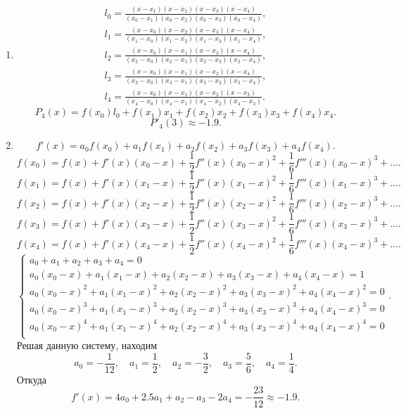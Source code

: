 \documentclass[a4paper]{article}
\begin{document}
\begin{sol}
\begin{enumerate}
\item 
\begin{gather*}
l_0=\frac{\left(x-x_1\right) \left(x-x_2\right) \left(x-x_3\right) \left(x-x_4\right)}{\left(x_0-x_1\right) \left(x_0-x_2\right) \left(x_0-x_3\right)
   \left(x_0-x_4\right)},\\l_1=
   \frac{\left(x-x_0\right) \left(x-x_2\right) \left(x-x_3\right) \left(x-x_4\right)}{\left(x_1-x_0\right) \left(x_1-x_2\right)
   \left(x_1-x_3\right) \left(x_1-x_4\right)},\\l_2=
   \frac{\left(x-x_0\right) \left(x-x_1\right) \left(x-x_3\right) \left(x-x_4\right)}{\left(x_2-x_0\right)
   \left(x_2-x_1\right) \left(x_2-x_3\right) \left(x_2-x_4\right)},\\l_3=
   \frac{\left(x-x_0\right) \left(x-x_1\right) \left(x-x_2\right)
   \left(x-x_4\right)}{\left(x_3-x_0\right) \left(x_3-x_1\right) \left(x_3-x_2\right) \left(x_3-x_4\right)},\\l_4=
   \frac{\left(x-x_0\right) \left(x-x_1\right)
   \left(x-x_2\right) \left(x-x_3\right)}{\left(x_4-x_0\right) \left(x_4-x_1\right) \left(x_4-x_2\right) \left(x_4-x_3\right)}.
\end{gather*}
\[
	P_4(x)=f(x_0)l_0+f(x_1)x_1+f(x_2)x_2+f(x_3)x_3+
	f(x_4)x_4
.\] 
\[
	P'_4(3)\approx -1.9
.\] 
\item \[
		f'(x)= a_0 f(x_0)+a_1 f(x_1)+a_2 f(x_2)+
		a_3 f(x_3)+ a_4 f(x_4)
.\] 
\[
	f(x_0)=f(x)+f'(x)(x_0-x)+\frac{1}{2} f''(x)(x_0-x)^2+
	\frac{1}{6}f'''(x)(x_0-x)^3+\ldots
.\] 
\[
	f(x_1)=f(x)+f'(x)(x_1-x)+\frac{1}{2} f''(x)(x_1-x)^2+
	\frac{1}{6}f'''(x)(x_1-x)^3+\ldots
.\]
\[
	f(x_2)=f(x)+f'(x)(x_2-x)+\frac{1}{2} f''(x)(x_2-x)^2+
	\frac{1}{6}f'''(x)(x_2-x)^3+\ldots
.\]
\[
	f(x_3)=f(x)+f'(x)(x_3-x)+\frac{1}{2} f''(x)(x_3-x)^2+
	\frac{1}{6}f'''(x)(x_3-x)^3+\ldots
.\]
\[
	f(x_4)=f(x)+f'(x)(x_4-x)+\frac{1}{2} f''(x)(x_4-x)^2+
	\frac{1}{6}f'''(x)(x_4-x)^3+\ldots
.\]
\[
\left\{
\begin{aligned}
a_0+a_1+a_2+a_3+a_4=0\\
a_0(x_0-x)+a_1(x_1-x)+a_2(x_2-x)+a_3(x_3-x)+a_4(x_4-x)=1\\
a_0(x_0-x)^2+a_1(x_1-x)^2+a_2(x_2-x)^2+a_3(x_3-x)^2+a_4(x_4-x)^2=0\\
a_0(x_0-x)^3+a_1(x_1-x)^3+a_2(x_2-x)^3+a_3(x_3-x)^3+a_4(x_4-x)^3=0\\
a_0(x_0-x)^4+a_1(x_1-x)^4+a_2(x_2-x)^4+a_3(x_3-x)^4+a_4(x_4-x)^4=0\\
\end{aligned}
\right.
.\] 
Решая данную систему, находим
\[
a_0= -\frac{1}{12},\quad a_1= \frac{1}{2},\quad a_2= -\frac{3}{2},\quad a_3= \frac{5}{6},\quad a_4= \frac{1}{4}
.\] 
Откуда
\[
	f'(x)=4 a_0+2.5 a_1+a_2-a_3-2 a_4= -\frac{23}{12}\approx -1.9
.\] 
\end{enumerate}
\end{sol}
\end{document}

